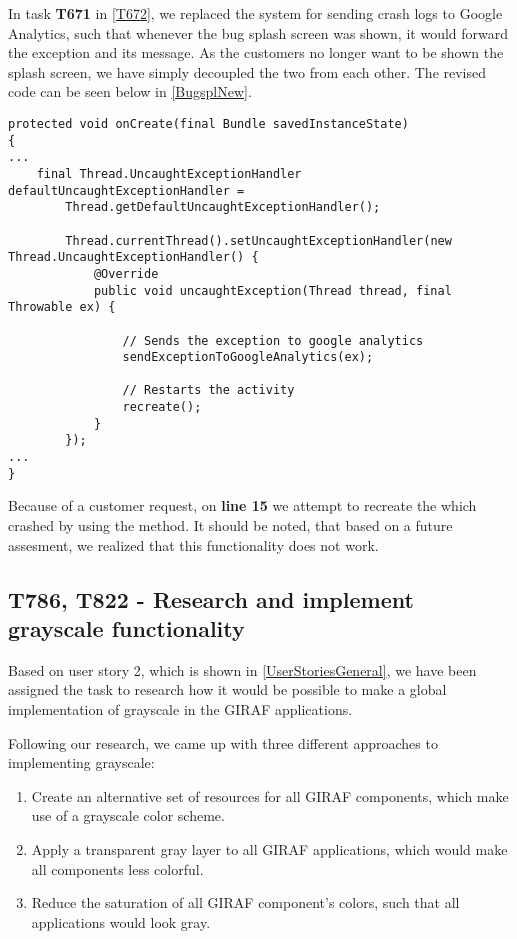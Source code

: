 In task \textbf{T671} in \autoref{T672}, we replaced the system for sending
crash logs to Google Analytics, such that whenever the bug splash screen was
shown, it would forward the exception and its message. As the customers no
longer want to be shown the splash screen, we have simply decoupled the two from
each other. The revised code can be seen below in \autoref{BugsplNew}.\nl

\begin{minipage}[H]{\linewidth}
\begin{lstlisting}[caption = We use Google Analytics and try to recreate the activity, label = BugsplNew] 
protected void onCreate(final Bundle savedInstanceState) 
{ 
...
	final Thread.UncaughtExceptionHandler defaultUncaughtExceptionHandler =
    	Thread.getDefaultUncaughtExceptionHandler();

        Thread.currentThread().setUncaughtExceptionHandler(new Thread.UncaughtExceptionHandler() {
            @Override
            public void uncaughtException(Thread thread, final Throwable ex) {

                // Sends the exception to google analytics
                sendExceptionToGoogleAnalytics(ex);

                // Restarts the activity
                recreate();
            }
        });
...
}
\end{lstlisting}
\end{minipage}

Because of a customer request, on \textbf{line 15} we attempt to
recreate the  which crashed by using the 
 method. It should be noted, that based on a future assesment, we
realized that this functionality does not work.

\subsection{T786, T822 - Research and implement grayscale functionality}
Based on user story 2, which is shown in \autoref{UserStoriesGeneral}, we have
been assigned the task to research how it would be possible to make a
global implementation of grayscale in the GIRAF applications.\nl

Following our research, we came up with three different approaches to
implementing grayscale:

\begin{enumerate}
  \item Create an alternative set of resources for all GIRAF components, which
  make use of a grayscale color scheme.
  \item Apply a transparent gray layer to all GIRAF applications, which would
  make all components less colorful.
  \item Reduce the saturation of all GIRAF component's colors, such that all
  applications would look gray.
\end{enumerate}

